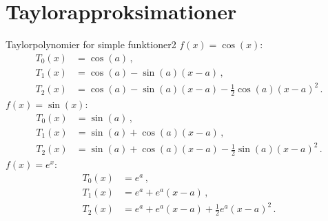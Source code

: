 \section*{Taylorapproksimationer}
\begin{opgave}{Taylorpolynomier for simple funktioner}{2}
	\opg $f(x)=\cos(x)$:
	\begin{align*}
	T_0(x) &= \cos(a) \, , \\
	T_1(x) &= \cos(a) - \sin(a)(x-a) \, , \\
	T_2(x) &= \cos(a) - \sin(a)(x-a) - \frac{1}{2}\cos(a)(x-a)^2 \, .
	\end{align*}
	\opg $f(x) = \sin(x)$:
	\begin{align*}
	T_0(x) &= \sin(a) \, , \\
	T_1(x) &= \sin(a) + \cos(a)(x-a) \, ,  \\
	T_2(x) &= \sin(a) + \cos(a)(x-a) -\frac{1}{2}\sin(a)(x-a)^2 \, .
	\end{align*}
	\opg $f(x) = e^x$:
	\begin{align*}
	T_0(x) &= e^a \, , \\
	T_1(x) &= e^a + e^a(x-a) \, , \\
	T_2(x) &= e^a + e^a(x-a) + \frac{1}{2}e^a(x-a)^2 \, .
	\end{align*}
\end{opgave}
